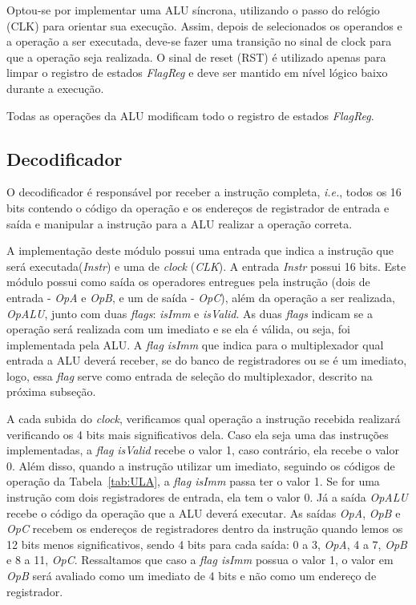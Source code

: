 \documentclass[11pt,a4paper,titlepage]{article}
\begin{document}
Optou-se por implementar uma ALU síncrona, utilizando o passo do relógio (CLK) para orientar sua execução. Assim, depois de selecionados os operandos e a operação a ser executada, deve-se fazer uma transição no sinal de clock para que a operação seja realizada. O sinal de reset (RST) é utilizado apenas para limpar o registro de estados \textit{FlagReg} e deve ser mantido em nível lógico baixo durante a execução.

Todas as operações da ALU modificam todo o registro de estados \textit{FlagReg}.

\subsection{Decodificador}\label{subsec:decode}

O decodificador é responsável por receber a instrução completa, \textit{i.e.}, todos os 16 bits contendo o código da operação e os endereços de registrador de entrada e saída e manipular a instrução para a ALU realizar a operação correta.

A implementação deste módulo possui uma entrada que indica a instrução que será executada(\textit{Instr}) e uma de \textit{clock} (\textit{CLK}).
A entrada \textit{Instr} possui 16 bits.
Este módulo possui como saída os operadores entregues pela instrução (dois de entrada - \textit{OpA} e \textit{OpB}, e um de saída - \textit{OpC}), além da operação a ser realizada, \textit{OpALU}, junto com duas \textit{flags}: \textit{isImm} e \textit{isValid}.
As duas \textit{flags} indicam se a operação será realizada com um imediato e se ela é válida, ou seja, foi implementada pela ALU.
A \textit{flag isImm} que indica para o multiplexador qual entrada a ALU deverá receber, se do banco de registradores ou se é um imediato, logo, essa \textit{flag} serve como entrada de seleção do multiplexador, descrito na próxima subseção.

A cada subida do \textit{clock}, verificamos qual operação a instrução recebida realizará verificando os 4 bits mais significativos dela.
Caso ela seja uma das instruções implementadas, a \textit{flag} \textit{isValid} recebe o valor 1, caso contrário, ela recebe o valor 0.
Além disso, quando a instrução utilizar um imediato, seguindo os códigos de operação da Tabela~\ref{tab:ULA}, a \textit{flag isImm} passa ter o valor 1.
Se for uma instrução com dois registradores de entrada, ela tem o valor 0.
Já a saída \textit{OpALU} recebe o código da operação que a ALU deverá executar.
As saídas \textit{OpA}, \textit{OpB} e \textit{OpC} recebem os endereços de registradores dentro da instrução quando lemos os 12 bits menos significativos, sendo 4 bits para cada saída: 0 a 3, \textit{OpA}, 4 a 7, \textit{OpB} e 8 a 11, \textit{OpC}.
Ressaltamos que caso a \textit{flag isImm} possua o valor 1, o valor em \textit{OpB} será avaliado como um imediato de 4 bits e não como um endereço de registrador.
\end{document}

